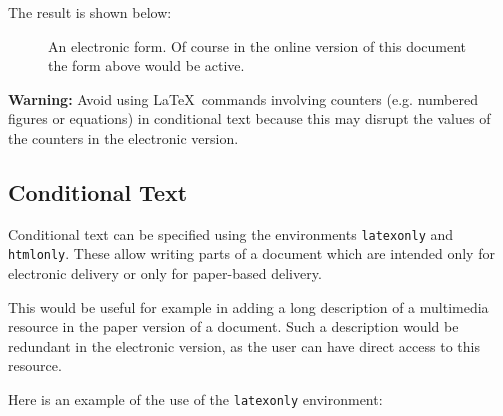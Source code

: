\documentclass[dvips]{article}
\begin{document}
\begin{latexonly}
The result is shown below:
\begin{figure}
    \begin{center}
    \end{center}
    \caption{An electronic form. Of course in the online version of this
     document the form above would be active.}
\end{figure}
\end{latexonly}

\textbf{Warning:} Avoid using \LaTeX\  commands involving counters (e.g.
numbered figures or equations) in conditional text because this may 
disrupt the values of the counters in the electronic version.

\subsection{Conditional Text}
\label{sec:latexonly}
  Conditional text can be specified
using the environments \texttt{latexonly} and \texttt{htmlonly}. These
allow writing parts of a document which are intended only for
electronic delivery or only for paper-based delivery.

This would be useful for example in adding a long description of a
multimedia resource in the paper version of a document. Such a
description would be redundant in the electronic version, as the user
can have direct access to this resource. 

Here is an example of the use of the \texttt{latexonly} environment:
\end{document}
